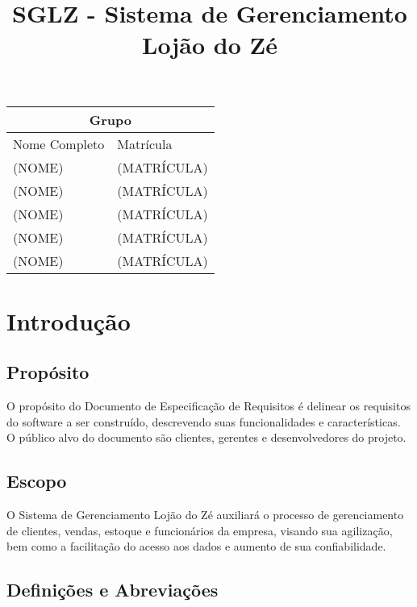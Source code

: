 \documentclass[notitlepage, draft]{article}
\title{\textbf{SGLZ} - Sistema de Gerenciamento Lojão do Zé}
\begin{document}
    \date{}
    \maketitle

\vspace{15cm}

\begin{tabular}{|p{10.5 cm}|p{4.5 cm}|}
    \hline
    \multicolumn{2}{|c|}{Grupo} \\
    \hline
    Nome Completo & Matrícula \\
    \hline
    (NOME)  & (MATRÍCULA) \\
    (NOME)  & (MATRÍCULA) \\
    (NOME)  & (MATRÍCULA) \\
    (NOME)  & (MATRÍCULA) \\
    (NOME)  & (MATRÍCULA) \\
    \hline
\end{tabular}
    
    
    \newpage
    
    
    \tableofcontents
    


    
    \newpage %
    
    \section{Introdução}
        \subsection{Propósito}
    O propósito do Documento de Especificação de Requisitos é delinear os requisitos do software a ser construído, descrevendo suas funcionalidades e características. O público alvo do documento são clientes, gerentes e desenvolvedores do projeto.
    
        \subsection{Escopo}
    O Sistema de Gerenciamento Lojão do Zé auxiliará o processo de gerenciamento de clientes, vendas, estoque e funcionários da empresa, visando sua agilização, bem como a facilitação do acesso aos dados e aumento de sua confiabilidade.
    
        \subsection{Definições e Abreviações}
        
\end{document}
